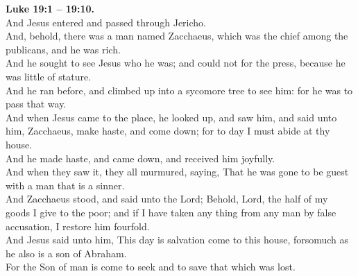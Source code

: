 \documentclass[10pt]{article} %
\begin{document}
{\begin{minipage}[t]{0.45\textwidth}
\textbf{Luke 19:1 -- 19:10.}\\
And Jesus entered and passed through Jericho.\\
And, behold, there was a man named Zacchaeus, which was the chief among the publicans, and he was rich.\\
And he sought to see Jesus who he was; and could not for the press, because he was little of stature.\\
And he ran before, and climbed up into a sycomore tree to see him: for he was to pass that way.\\
And when Jesus came to the place, he looked up, and saw him, and said unto him, Zacchaeus, make haste, and come down; for to day I must abide at thy house.\\
And he made haste, and came down, and received him joyfully.\\
And when they saw it, they all murmured, saying, That he was gone to be guest with a man that is a sinner.\\
And Zacchaeus stood, and said unto the Lord; Behold, Lord, the half of my goods I give to the poor; and if I have taken any thing from any man by false accusation, I restore him fourfold.\\
And Jesus said unto him, This day is salvation come to this house, forsomuch as he also is a son of Abraham.\\
For the Son of man is come to seek and to save that which was lost.\\

\end{minipage}}
\vspace*{\fill}
\newpage
\Huge%
\vspace*{\fill}
\onehalfspacing %
\vspace*{\fill}
\end{document}
